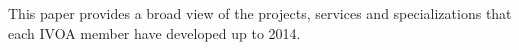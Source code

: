 

This paper provides a broad view of the projects, services and specializations
that each IVOA member have developed up to 2014. 





